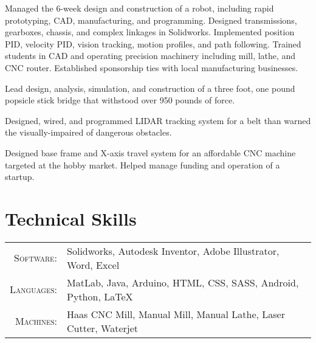 \documentclass{resume_template}
\begin{document}
Managed the 6-week design and construction of a robot, including rapid prototyping, CAD, manufacturing, and programming. Designed transmissions, gearboxes, chassis, and complex linkages in Solidworks. Implemented position PID, velocity PID, vision tracking, motion profiles, and path following. Trained students in CAD and operating precision machinery including mill, lathe, and CNC router. Established sponsorship ties with local manufacturing businesses.

Lead design, analysis, simulation, and construction of a three foot, one pound popsicle stick bridge that withstood over 950 pounds of force.



Designed, wired, and programmed LIDAR tracking system for a belt than warned the visually-impaired of dangerous obstacles.

Designed base frame and X-axis travel system for an affordable CNC machine targeted at the hobby market. Helped manage funding and operation of a startup.

\section{Technical Skills}
\begin{tabular}{rl}
  \textsc{Software:}   & Solidworks, Autodesk Inventor, Adobe Illustrator, Word, Excel\\
  \textsc{Languages:}  & MatLab, Java, Arduino, HTML, CSS, SASS, Android, Python, \LaTeX\\
  \textsc{Machines:}   & Haas CNC Mill, Manual Mill, Manual Lathe, Laser Cutter, Waterjet\\
\end{tabular}
\end{document}
